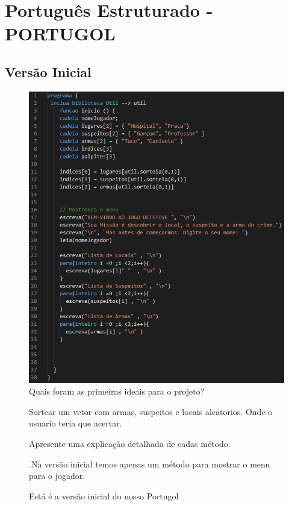 \chapter{Português Estruturado - PORTUGOL}
\section{Versão Inicial}
\begin{figure}[!h]
\vspace{-10mm}
    \centering
    \caption{ Está é a versão inicial do nosso Portugol}
    \label{fig:enter-label}
    \includegraphics[scale=0.75]{print 2.png }   
    \vspace{8mm}
    \newline
   {\large Quais foram as primeiras ideais para o projeto?}
   
   \begin{flushleft}
 Sortear um vetor com armas, suspeitos e locais aleatorios. Onde o usuario teria que acertar.
\end{flushleft}

 {\large Apresente uma explicação detalhada de cadas método.}
 \begin{flushleft}
.Na versão inicial temos apenas um método para mostrar o menu para o jogador.
\end{flushleft}   
\end{figure}
\pagebreak
